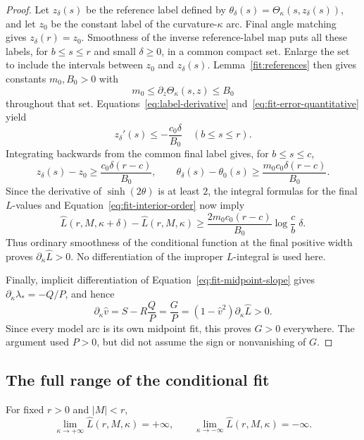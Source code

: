 \begin{proof}
Let \(z_\delta(s)\) be the reference label defined by
\(\theta_\delta(s)=\Theta_\kappa(s,z_\delta(s))\), and let \(z_0\)
be the constant label of the curvature-\(\kappa\) arc.  Final angle
matching gives \(z_\delta(r)=z_0\).  Smoothness of the inverse
reference-label map puts all these labels, for \(b\le s\le r\) and
small \(\delta\ge0\), in a common compact set.  Enlarge the set to
include the intervals between \(z_0\) and \(z_\delta(s)\).
Lemma~\ref{fit:references} then gives constants \(m_0,B_0>0\) with
\[
 m_0\le\partial_z\Theta_\kappa(s,z)\le B_0
\]
throughout that set.  Equations~\eqref{eq:label-derivative}
and~\eqref{eq:fit-error-quantitative} yield
\[
 z_\delta'(s)\le-\frac{c_0\delta}{B_0}\quad(b\le s\le r).
\]
Integrating backwards from the common final label gives, for
\(b\le s\le c\),
\[
 z_\delta(s)-z_0\ge\frac{c_0\delta(r-c)}{B_0},\qquad
 \theta_\delta(s)-\theta_0(s)
    \ge\frac{m_0c_0\delta(r-c)}{B_0}.
\]
Since the derivative of \(\sinh(2\theta)\) is at least \(2\),
the integral formulas for the final \(L\)-values and
Equation~\eqref{eq:fit-interior-order} now imply
\begin{equation}\label{eq:fit-L-quantitative}
 \widehat L(r,M,\kappa+\delta)-\widehat L(r,M,\kappa)
 \ge \frac{2m_0c_0(r-c)}{B_0}\log\!\frac cb\;\delta.
\end{equation}
Thus ordinary smoothness of the conditional function at the final
positive width proves \(\partial_\kappa\widehat L>0\).
No differentiation of the improper \(L\)-integral is used here.

Finally, implicit differentiation of
Equation~\eqref{eq:fit-midpoint-slope} gives
\(\partial_\kappa\lambda_*=-Q/P\), and hence
\[
 \partial_\kappa\widehat v
     =S-R\frac QP=\frac GP
     =(1-\widehat v^2)\partial_\kappa\widehat L>0.
\]
Since every model arc is its own midpoint fit, this proves \(G>0\)
everywhere.  The argument used \(P>0\), but did not assume the sign
or nonvanishing of \(G\).
\end{proof}

\subsection{The full range of the conditional fit}

\begin{lemma}\label{fit:properness}
For fixed \(r>0\) and \(|M|<r\),
\begin{equation}\label{eq:fit-properness}
 \lim_{\kappa\to+\infty}\widehat L(r,M,\kappa)=+\infty,
 \qquad
 \lim_{\kappa\to-\infty}\widehat L(r,M,\kappa)=-\infty.
\end{equation}
\end{lemma}

